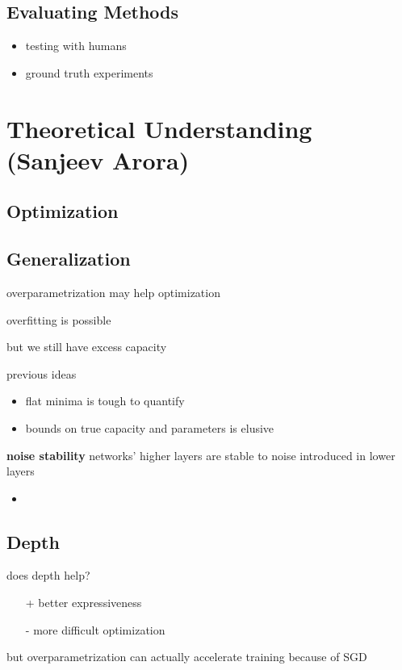 \documentclass[]{article}
\theoremstyle{definition}
\begin{document}
    \subsection{Evaluating Methods}%
    \label{sub:evaluating_methods}

    \begin{itemize}
        \item testing with humans
        \item ground truth experiments
    \end{itemize}

    \section{Theoretical Understanding {\small(Sanjeev Arora)}}%
    \label{sec:theoretical_understanding_sanjeev_arora_}

    \subsection{Optimization}%
    \label{sub:optimization}

    \subsection{Generalization}%
    \label{sub:generalization}

    overparametrization may help optimization

    overfitting is possible

    but we still have excess capacity

    previous ideas
    \begin{itemize}
        \item flat minima is tough to quantify
        \item bounds on true capacity and parameters is elusive
    \end{itemize}

    \textbf{noise stability} networks' higher layers are stable to noise introduced in lower layers
    \begin{itemize}
        \item
    \end{itemize}

    \subsection{Depth}%
    \label{sub:depth}

    does depth help?
    \begin{itemize}
        \item[+] better expressiveness
        \item[-] more difficult optimization
    \end{itemize}
    but overparametrization can actually accelerate training because of SGD
\end{document}

